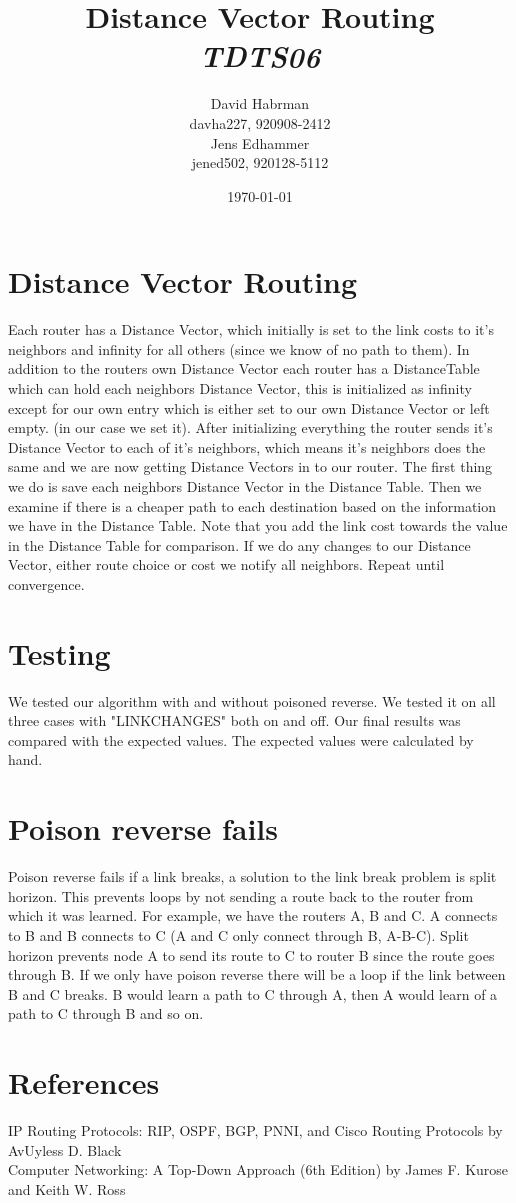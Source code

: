 \documentclass[10pt]{article}
\title{Distance Vector Routing\\
\emph{TDTS06}}
\author{David Habrman \\ davha227, 920908-2412\\
Jens Edhammer \\ jened502, 920128-5112 }
\date{\today}
\begin{document}
\maketitle

\newpage
\tableofcontents
\newpage

\section{Distance Vector Routing}
Each router has a Distance Vector, which initially is set to the link costs to
it's neighbors and infinity for all others (since we know of no path to them).
In addition to the routers own Distance Vector each router has a DistanceTable
which can hold each neighbors Distance Vector, this is initialized as infinity
except for our own entry which is either set to our own Distance Vector or left
empty. (in our case we set it). After initializing everything the router sends
it's Distance Vector to each of it's neighbors, which means it's neighbors does
the same and we are now getting Distance Vectors in to our router. The first
thing we do is save each neighbors Distance Vector in the Distance Table. Then
we examine if there is a cheaper path to each destination based on the
information we have in the Distance Table. Note that you add the link cost 
towards the value in the Distance Table for comparison. If we do any changes
to our Distance Vector, either route choice or cost we notify all neighbors.
Repeat until convergence.

\section{Testing}
We tested our algorithm with and without poisoned reverse. We tested it on all
three cases with "LINKCHANGES" both on and off. Our final results was compared
with the expected values. The expected values were calculated by hand.

\section{Poison reverse fails}
Poison reverse fails if a link breaks, a solution to the link break problem is
split horizon. This prevents loops by not sending a route back to the router
from which it was learned. For example, we have the routers A, B and C. A
connects to B and B connects to C (A and C only connect through B, A-B-C).
Split horizon prevents node A to send its route to C to router B since the
route goes through B. If we only have poison reverse there will be a loop
if the link between B and C breaks. B would learn a path to C through A,
then A would learn of a path to C through B and so on.

\section{References}
IP Routing Protocols: RIP, OSPF, BGP, PNNI, and Cisco Routing Protocols by  AvUyless D. Black \\
Computer Networking: A Top-Down Approach (6th Edition) by James F. Kurose and Keith W. Ross
\end{document}
